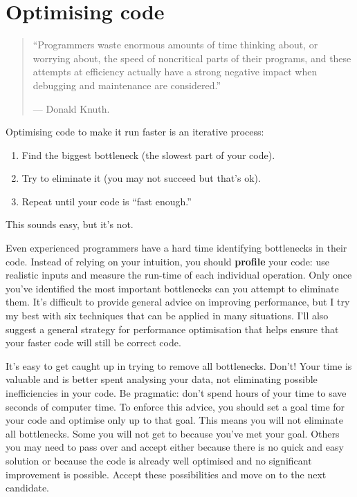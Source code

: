 \hypertarget{profiling}{%
\chapter{Optimising code}\label{profiling}}

\begin{quote}
``Programmers waste enormous amounts of time thinking about, or worrying
about, the speed of noncritical parts of their programs, and these
attempts at efficiency actually have a strong negative impact when
debugging and maintenance are considered.''

--- Donald Knuth.
\end{quote}

Optimising code to make it run faster is an iterative process:

\begin{enumerate}
\def\labelenumi{\arabic{enumi}.}
\tightlist
\item
  Find the biggest bottleneck (the slowest part of your code).
\item
  Try to eliminate it (you may not succeed but that's ok).
\item
  Repeat until your code is ``fast enough.''
\end{enumerate}

This sounds easy, but it's not.

Even experienced programmers have a hard time identifying bottlenecks in
their code. Instead of relying on your intuition, you should
\textbf{profile} your code: use realistic inputs and measure the
run-time of each individual operation. Only once you've identified the
most important bottlenecks can you attempt to eliminate them. It's
difficult to provide general advice on improving performance, but I try
my best with six techniques that can be applied in many situations. I'll
also suggest a general strategy for performance optimisation that helps
ensure that your faster code will still be correct code.

It's easy to get caught up in trying to remove all bottlenecks. Don't!
Your time is valuable and is better spent analysing your data, not
eliminating possible inefficiencies in your code. Be pragmatic: don't
spend hours of your time to save seconds of computer time. To enforce
this advice, you should set a goal time for your code and optimise only
up to that goal. This means you will not eliminate all bottlenecks. Some
you will not get to because you've met your goal. Others you may need to
pass over and accept either because there is no quick and easy solution
or because the code is already well optimised and no significant
improvement is possible. Accept these possibilities and move on to the
next candidate. 

